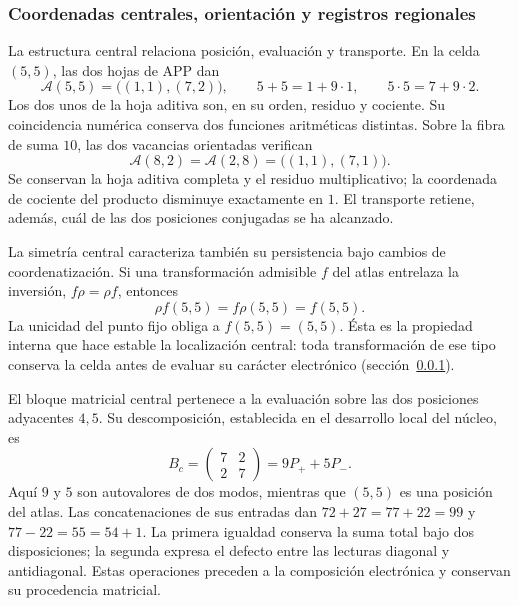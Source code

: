 \subsubsection{Coordenadas centrales, orientación y registros regionales}
\label{el-centro:registros}

La estructura central relaciona posición, evaluación y transporte. En la
celda \((5,5)\), las dos hojas de APP dan
\begin{equation}
 \mathcal A(5,5)=\bigl((1,1),(7,2)\bigr),\qquad
 5+5=1+9\cdot1,\qquad5\cdot5=7+9\cdot2.
 \label{el-centro:app}
\end{equation}
Los dos unos de la hoja aditiva son, en su orden, residuo y cociente.
Su coincidencia numérica conserva dos funciones aritméticas distintas.
Sobre la fibra de suma \(10\), las dos vacancias orientadas verifican
\begin{equation}
 \mathcal A(8,2)=\mathcal A(2,8)=\bigl((1,1),(7,1)\bigr).
 \label{el-centro:vacancias}
\end{equation}
Se conservan la hoja aditiva completa y el residuo multiplicativo;
la coordenada de cociente del producto disminuye exactamente en
\(1\). El transporte retiene, además, cuál de las dos posiciones
conjugadas se ha alcanzado.



La simetría central caracteriza también su persistencia bajo cambios de
coordenatización. Si una transformación admisible \(f\) del atlas entrelaza la
inversión, \(f\rho=\rho f\), entonces
\[
 \rho f(5,5)=f\rho(5,5)=f(5,5).
\]
La unicidad del punto fijo obliga a \(f(5,5)=(5,5)\). Ésta es la
propiedad interna que hace estable la localización central: toda
transformación de ese tipo conserva la celda antes de evaluar su
carácter electrónico (sección~\ref{el-centro:registros}).

El bloque matricial central pertenece a la evaluación sobre las dos
posiciones adyacentes \(4,5\). Su descomposición, establecida en el
desarrollo local del núcleo, es
\[
 B_c=\begin{pmatrix}7&2\\2&7\end{pmatrix}=9P_++5P_-.
\]
Aquí \(9\) y \(5\) son autovalores de dos modos, mientras que
\((5,5)\) es una posición del atlas. Las concatenaciones de sus
entradas dan \(72+27=77+22=99\) y
\(77-22=55=54+1\). La primera igualdad conserva la suma total bajo
dos disposiciones; la segunda expresa el defecto entre las lecturas
diagonal y antidiagonal. Estas operaciones preceden a la composición
electrónica y conservan su procedencia matricial.

